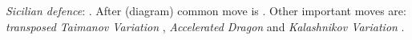 \emph{Sicilian defence}: .
After  (diagram) common move is .
Other important moves are:
\emph{transposed Taimanov Variation} ,
\emph{Accelerated Dragon}  and
\emph{Kalashnikov Variation} .
